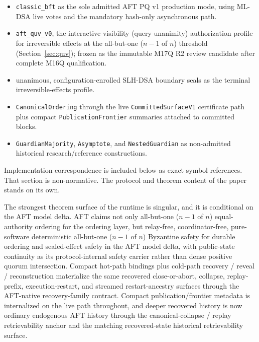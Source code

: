 \documentclass[11pt]{article}
\newcommand{\AFT}{\textsc{AFT}}
\newcommand{\code}[1]{\texttt{#1}}
\begin{document}
\begin{itemize}[leftmargin=1.5em]
\item \code{classic\_bft} as the sole admitted AFT PQ v1 production mode,
using ML-DSA live votes and the mandatory hash-only asynchronous path.
\item \code{aft\_quv\_v0}, the interactive-visibility (query-unanimity)
authorization profile for irreversible effects at the all-but-one
(\(n-1\) of \(n\)) threshold (Section~\ref{sec:quv}); frozen as the
immutable M17Q R2 review candidate after complete M16Q qualification.
\item unanimous, configuration-enrolled SLH-DSA boundary seals as the terminal
irreversible-effects profile.
\item \code{CanonicalOrdering} through the live
\code{CommittedSurfaceV1} certificate path plus compact
\code{PublicationFrontier} summaries attached to committed blocks.
\item \code{GuardianMajority}, \code{Asymptote}, and \code{NestedGuardian} as
non-admitted historical research/reference constructions.
\end{itemize}

Implementation correspondence is included below as exact symbol references.
That section is non-normative. The protocol and theorem content of the paper
stands on its own.

The strongest theorem surface of the runtime is singular, and it is
conditional on the AFT model delta.
\AFT{} claims not only all-but-one (\(n-1\) of \(n\)) equal-authority ordering
for the ordering layer, but relay-free, coordinator-free, pure-software
deterministic all-but-one (\(n-1\) of \(n\)) Byzantine safety for durable
ordering and sealed-effect safety in the AFT model delta,
with public-state continuity as its protocol-internal safety carrier rather
than dense positive quorum intersection. Compact hot-path bindings plus
cold-path recovery / reveal / reconstruction materialize the same recovered
close-or-abort, collapse, replay-prefix, execution-restart, and streamed
restart-ancestry surfaces through the AFT-native recovery-family contract.
Compact publication/frontier metadata is internalized on the live path
throughout, and deeper recovered history is now ordinary endogenous AFT history
through the canonical-collapse / replay retrievability anchor and the matching
recovered-state historical retrievability surface.
\end{document}
